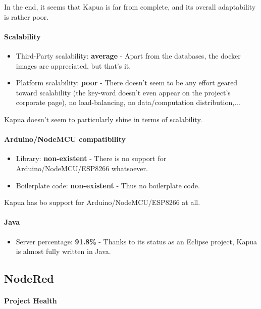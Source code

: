 \documentclass{article}
\begin{document}
In the end, it seems that Kapua is far from complete, and its overall adaptability is rather poor.

\paragraph{Scalability}

\begin{itemize}
\item Third-Party scalability: \textbf{average} - Apart from the databases, the docker images are appreciated, but that's it.
\item Platform scalability: \textbf{poor} - There doesn't seem to be any effort geared toward scalability (the key-word doesn't even appear on the project's corporate page), no load-balancing, no data/computation distribution,...
\end{itemize}

Kapua doesn't seem to particularly shine in terms of scalability.

\paragraph{Arduino/NodeMCU compatibility}

\begin{itemize}
\item Library: \textbf{non-existent} - There is no support for Arduino/NodeMCU/ESP8266 whatsoever.
\item Boilerplate code: \textbf{non-existent} - Thus no boilerplate code.
\end{itemize}

Kapua has bo support for Arduino/NodeMCU/ESP8266 at all.

\paragraph{Java} 

\begin{itemize}
\item Server percentage: \textbf{91.8\%} - Thanks to its status as an Eclipse project, Kapua is almost fully written in Java.
\end{itemize}

\subsection{NodeRed}

\paragraph{Project Health}
\end{document}
